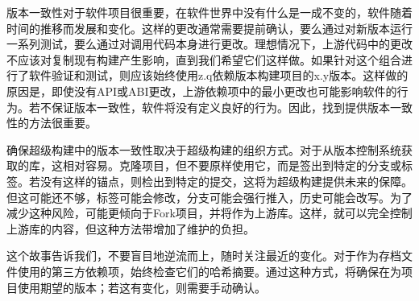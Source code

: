 
版本一致性对于软件项目很重要，在软件世界中没有什么是一成不变的，软件随着时间的推移而发展和变化。这样的更改通常需要提前确认，要么通过对新版本运行一系列测试，要么通过对调用代码本身进行更改。理想情况下，上游代码中的更改不应该对复制现有构建产生影响，直到我们希望它们这样做。如果针对这个组合进行了软件验证和测试，则应该始终使用z.q依赖版本构建项目的x.y版本。这样做的原因是，即使没有API或ABI更改，上游依赖项中的最小更改也可能影响软件的行为。若不保证版本一致性，软件将没有定义良好的行为。因此，找到提供版本一致性的方法很重要。

确保超级构建中的版本一致性取决于超级构建的组织方式。对于从版本控制系统获取的库，这相对容易。克隆项目，但不要原样使用它，而是签出到特定的分支或标签。若没有这样的锚点，则检出到特定的提交，这将为超级构建提供未来的保障。但这可能还不够，标签可能会修改，分支可能会强行推入，历史可能会改写。为了减少这种风险，可能更倾向于Fork项目，并将作为上游库。这样，就可以完全控制上游库的内容，但这种方法带增加了维护的负担。

这个故事告诉我们，不要盲目地逆流而上，随时关注最近的变化。对于作为存档文件使用的第三方依赖项，始终检查它们的哈希摘要。通过这种方式，将确保在为项目使用期望的版本；若这有变化，则需要手动确认。












































